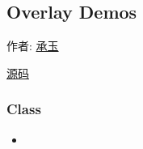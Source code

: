 \documentclass[letterpaper,10pt,english]{sphinxmanual}
\begin{document}
\subsection{Overlay Demos}
\label{demo/component/overlay/index:overlay-demos}\label{demo/component/overlay/index::doc}
\begin{DUlineblock}{0em}
\item[] 作者: \href{mailto:yiminghe@gmail.com}{承玉}
\item[] \href{https://github.com/kissyteam/kissy/tree/master/src/overlay/}{源码}
\end{DUlineblock}


\subsubsection{Class}
\label{demo/component/overlay/index:class}\begin{itemize}
\item {}
{\hyperref[api/component/overlay/popup:module-Overlay]{}}

\end{itemize}
\end{document}
